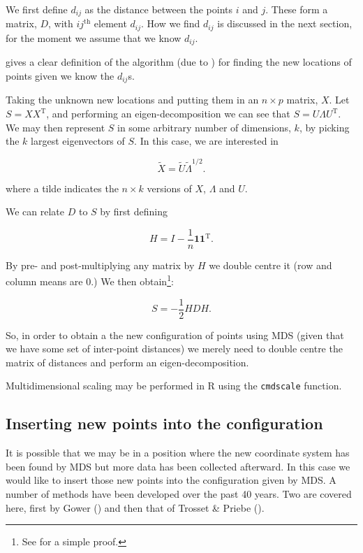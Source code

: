 \documentclass[a4paper,10pt]{amsart}
\newcommand{\tr}[1]{#1^{\text{T}}}
\begin{document}
We first define $d_{ij}$ as the distance between the points $i$ and $j$. These form a matrix, $D$, with $ij^{\text{th}}$ element $d_{ij}$. How we find $d_{ij}$ is discussed in the next section, for the moment we assume that we know $d_{ij}$.

\cite{diaconis08} gives a clear definition of the algorithm (due to \cite{schoenberg35}) for finding the new locations of points given we know the $d_{ij}$s. 

Taking the unknown new locations and putting them in an $n \times p$ matrix, $X$. Let $S=X\tr{X}$, and performing an eigen-decomposition we can see that $S=U\Lambda\tr{U}$. We may then represent $S$ in some arbitrary number of dimensions, $k$, by picking the $k$ largest eigenvectors of $S$. In this case, we are interested in

\begin{equation}
\tilde{X}=\tilde{U}\tilde{\Lambda}^{1/2}.
\end{equation}

where a tilde indicates the $n \times k$ versions of $X$, $\Lambda$ and $U$.

We can relate $D$ to $S$ by first defining

\begin{equation}
H = I-\frac{1}{n}\mathbf{1}\tr{\mathbf{1}}.
\end{equation}

By pre- and post-multiplying any matrix by $H$ we double centre it (row and column means are 0.) We then obtain\footnote{See \cite{diaconis08} for a simple proof.}:

\begin{equation}
S = -\frac{1}{2}HDH.
\end{equation}

So, in order to obtain a the new configuration of points using MDS (given that we have some set of inter-point distances) we merely need to double centre the matrix of distances and perform an eigen-decomposition.

Multidimensional scaling may be performed in \textsf{R} using the \texttt{cmdscale} function. 

\subsection{Inserting new points into the configuration}

It is possible that we may be in a position where the new coordinate system has been found by MDS but more data has been collected afterward. In this case we would like to insert those new points into the configuration given by MDS. A number of methods have been developed over the past 40 years. Two are covered here, first by Gower (\cite{gower1968}) and then that of Trosset \& Priebe (\cite{Trosset2008}).
\end{document}
